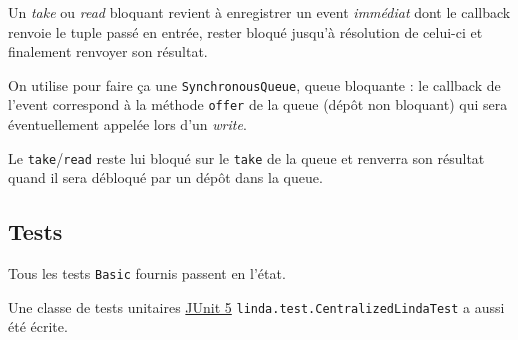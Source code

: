 \documentclass[headings=standardclasses,parskip=half]{scrartcl}
\begin{document}
Un \emph{take} ou \emph{read} bloquant revient à enregistrer un event
\emph{immédiat} dont le callback renvoie le tuple passé en entrée,
rester bloqué jusqu'à résolution de celui-ci et finalement renvoyer
son résultat.

On utilise pour faire ça une \texttt{SynchronousQueue}, queue bloquante :
le callback de l'event correspond à la méthode \texttt{offer} de la queue
(dépôt non bloquant) qui sera éventuellement appelée lors d'un \emph{write}.

Le \texttt{take}/\texttt{read} reste lui bloqué sur le \texttt{take} de la
queue et renverra son résultat quand il sera débloqué par un dépôt dans
la queue.

\subsection*{Tests}

Tous les tests \texttt{Basic} fournis passent en l'état.

Une classe de tests unitaires \href{https://junit.org/junit5/}{JUnit 5}
\texttt{linda.test.CentralizedLindaTest} a aussi été écrite.
\end{document}
